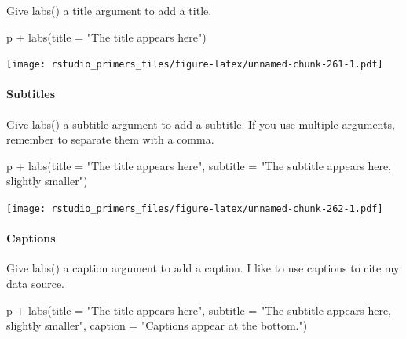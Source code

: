\documentclass[
]{article}
\newenvironment{Shaded}{\begin{snugshade}}{\end{snugshade}}
\newcommand{\AttributeTok}[1]{\textcolor[rgb]{0.77,0.63,0.00}{#1}}
\newcommand{\FunctionTok}[1]{\textcolor[rgb]{0.00,0.00,0.00}{#1}}
\newcommand{\NormalTok}[1]{#1}
\newcommand{\SpecialCharTok}[1]{\textcolor[rgb]{0.00,0.00,0.00}{#1}}
\newcommand{\StringTok}[1]{\textcolor[rgb]{0.31,0.60,0.02}{#1}}
\begin{document}
Give labs() a title argument to add a title.

\begin{Shaded}
\begin{Highlighting}[]
\NormalTok{p }\SpecialCharTok{+} \FunctionTok{labs}\NormalTok{(}\AttributeTok{title =} \StringTok{"The title appears here"}\NormalTok{)}
\end{Highlighting}
\end{Shaded}

\texttt{[image: rstudio\_primers\_files/figure-latex/unnamed-chunk-261-1.pdf]}

\hypertarget{subtitles}{%
\paragraph{Subtitles}\label{subtitles}}

Give labs() a subtitle argument to add a subtitle. If you use multiple
arguments, remember to separate them with a comma.

\begin{Shaded}
\begin{Highlighting}[]
\NormalTok{p }\SpecialCharTok{+} \FunctionTok{labs}\NormalTok{(}\AttributeTok{title =} \StringTok{"The title appears here"}\NormalTok{,}
         \AttributeTok{subtitle =} \StringTok{"The subtitle appears here, slightly smaller"}\NormalTok{)}
\end{Highlighting}
\end{Shaded}

\texttt{[image: rstudio\_primers\_files/figure-latex/unnamed-chunk-262-1.pdf]}

\hypertarget{captions}{%
\paragraph{Captions}\label{captions}}

Give labs() a caption argument to add a caption. I like to use captions
to cite my data source.

\begin{Shaded}
\begin{Highlighting}[]
\NormalTok{p }\SpecialCharTok{+} \FunctionTok{labs}\NormalTok{(}\AttributeTok{title =} \StringTok{"The title appears here"}\NormalTok{,}
         \AttributeTok{subtitle =} \StringTok{"The subtitle appears here, slightly smaller"}\NormalTok{,}
         \AttributeTok{caption =} \StringTok{"Captions appear at the bottom."}\NormalTok{)}
\end{Highlighting}
\end{Shaded}
\end{document}
